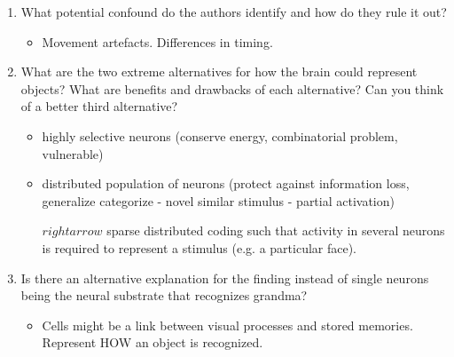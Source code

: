 \documentclass[12pt,english]{scrartcl}
\begin{document}
\begin{enumerate}
  
 \color{black}
 \item What potential confound do the authors identify and how do they rule it out? \\
 \color{blue}
 \begin{itemize}
  \item Movement artefacts. Differences in timing.
 \end{itemize}
 
\color{black}
 \item What are the two extreme alternatives for how the brain could represent objects? What are benefits and drawbacks of each alternative? Can you think of a better third alternative? \\
 \color{blue}
 \begin{itemize}
  \item highly selective neurons (conserve energy, combinatorial problem, vulnerable)
  \item distributed population of neurons (protect against information loss, generalize categorize - novel similar stimulus - partial activation)
 \item[$rightarrow$] sparse distributed coding such that activity in several neurons is required to represent a stimulus (e.g. a particular face). 
 \end{itemize}
 
\color{black}
 \item Is there an alternative explanation for the finding instead of single neurons being the neural substrate that recognizes grandma?\\
 \color{blue}
 \begin{itemize}
 \item Cells might be a link between visual processes and stored memories. Represent HOW an object is recognized.
 \end{itemize}
\end{enumerate}
\end{document}
